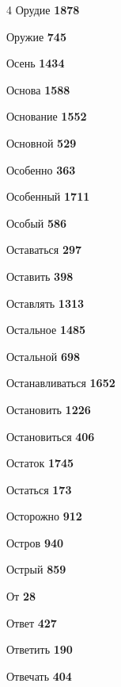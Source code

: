 \begin{multicols}{4}
\noindent Орудие \dotfill \textbf{\color{secondary} 1878}\par
\noindent Оружие \dotfill \textbf{\color{secondary} 745}\par
\noindent Осень \dotfill \textbf{\color{secondary} 1434}\par
\noindent Основа \dotfill \textbf{\color{secondary} 1588}\par
\noindent Основание \dotfill \textbf{\color{secondary} 1552}\par
\noindent Основной \dotfill \textbf{\color{secondary} 529}\par
\noindent Особенно \dotfill \textbf{\color{secondary} 363}\par
\noindent Особенный \dotfill \textbf{\color{secondary} 1711}\par
\noindent Особый \dotfill \textbf{\color{secondary} 586}\par
\noindent Оставаться \dotfill \textbf{\color{secondary} 297}\par
\noindent Оставить \dotfill \textbf{\color{secondary} 398}\par
\noindent Оставлять \dotfill \textbf{\color{secondary} 1313}\par
\noindent Остальное \dotfill \textbf{\color{secondary} 1485}\par
\noindent Остальной \dotfill \textbf{\color{secondary} 698}\par
\noindent Останавливаться \dotfill \textbf{\color{secondary} 1652}\par
\noindent Остановить \dotfill \textbf{\color{secondary} 1226}\par
\noindent Остановиться \dotfill \textbf{\color{secondary} 406}\par
\noindent Остаток \dotfill \textbf{\color{secondary} 1745}\par
\noindent Остаться \dotfill \textbf{\color{secondary} 173}\par
\noindent Осторожно \dotfill \textbf{\color{secondary} 912}\par
\noindent Остров \dotfill \textbf{\color{secondary} 940}\par
\noindent Острый \dotfill \textbf{\color{secondary} 859}\par
\noindent От \dotfill \textbf{\color{secondary} 28}\par
\noindent Ответ \dotfill \textbf{\color{secondary} 427}\par
\noindent Ответить \dotfill \textbf{\color{secondary} 190}\par
\noindent Отвечать \dotfill \textbf{\color{secondary} 404}\par

\end{multicols}
